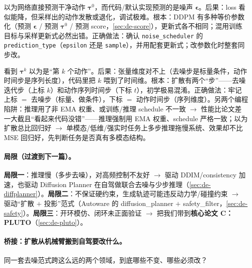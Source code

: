 \begin{pitfall}
以为网络直接预测干净动作 $\boldsymbol{\tau}^0$，而代码/默认实现预测的是噪声 $\boldsymbol{\epsilon}$。后果：loss 看似能降，但采样出的动作发散或退化，调试极难。根本：DDPM 有多种等价参数化（预测 $\boldsymbol{\epsilon}$ / 预测 $\boldsymbol{\tau}^0$ / 预测 score，\cref{sec:de-score}），更新式各不相同；混用训练目标与采样更新式必然出错。正确做法：确认 \texttt{noise\_scheduler} 的 \texttt{prediction\_type}（\texttt{epsilon} 还是 \texttt{sample}），并用配套更新式；改参数化时整套同步改。
\end{pitfall}

\begin{pitfall}
看到 $\boldsymbol{\tau}^k$ 以为是“第 $k$ 个动作”。后果：张量维度对不上（去噪步是标量条件，动作时间步是序列长度），代码里把 $k$ 喂到了时间维。根本：扩散有两个“步”——去噪迭代步（上标 $k$）和动作序列时间步（下标 $t$），初学极易混淆。正确做法：牢记上标 $=$ 去噪步（标量、做条件），下标 $=$ 动作时间步（序列维度）。另两个编程陷阱：推理用了非 EMA 权重、或训练/推理 schedule 不一致 $\to$ 性能比论文差一大截且“看起来代码没错”——推理强制用 EMA 权重、schedule 严格一致；以为扩散总比回归好 $\to$ 单模态/低维/强实时任务上多步推理拖慢系统、效果却不比 MSE 回归好，先判断任务是否真有多模态结构。
\end{pitfall}

\paragraph{局限（过渡到下一篇）。}
\textbf{局限一}：推理慢（多步去噪），对高频控制不友好 $\to$ 驱动 DDIM/consistency 加速，也驱动 Diffusion Planner 在自驾做联合去噪与少步推理（\cref{sec:de-diffplanner}）。\textbf{局限二}：不保证硬约束，生成轨迹可能违反动力学/碰撞约束 $\to$ 驱动“扩散 $+$ 投影”范式（Autoware 的 diffusion\_planner $+$ safety\_filter，\cref{sec:de-safety}）。\textbf{局限三}：开环模仿、闭环未正面验证 $\to$ 把我们带到\textbf{核心论文 C：PLUTO}（\cref{sec:de-pluto}）。

\paragraph{桥接：扩散从机械臂搬到自驾要改什么。}
同一套去噪范式跨这么远的两个领域，到底哪些不变、哪些必须改？

